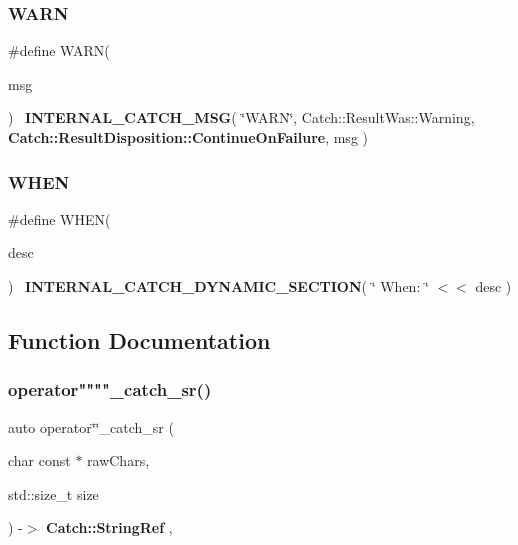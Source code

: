 \subsubsection{WARN}
{\footnotesize\ttfamily \#define W\+A\+RN(\begin{DoxyParamCaption}\item[{}]{msg }\end{DoxyParamCaption})~\textbf{ I\+N\+T\+E\+R\+N\+A\+L\+\_\+\+C\+A\+T\+C\+H\+\_\+\+M\+SG}( \char`\"{}W\+A\+RN\char`\"{}, Catch\+::\+Result\+Was\+::\+Warning, \textbf{ Catch\+::\+Result\+Disposition\+::\+Continue\+On\+Failure}, msg )}

\mbox{\label{catch_8hpp_ab09e9b8186233f676ce6a23aebe89d6e}} 
\subsubsection{WHEN}
{\footnotesize\ttfamily \#define W\+H\+EN(\begin{DoxyParamCaption}\item[{}]{desc }\end{DoxyParamCaption})~\textbf{ I\+N\+T\+E\+R\+N\+A\+L\+\_\+\+C\+A\+T\+C\+H\+\_\+\+D\+Y\+N\+A\+M\+I\+C\+\_\+\+S\+E\+C\+T\+I\+ON}( \char`\"{}     When\+: \char`\"{} $<$$<$ desc )}



\subsection{Function Documentation}
\mbox{\label{catch_8hpp_a741882c3457a7d151a0e81fd3f011b31}} 
\subsubsection{operator""""\_catch\_sr()}
{\footnotesize\ttfamily auto operator\char`\"{}\char`\"{}\+\_\+catch\+\_\+sr (\begin{DoxyParamCaption}\item[{char const $\ast$}]{raw\+Chars,  }\item[{std\+::size\+\_\+t}]{size }\end{DoxyParamCaption}) -\/$>$ \textbf{ Catch\+::\+String\+Ref} \hspace{0.3cm}{\ttfamily [inline]}, {\ttfamily [noexcept]}}

